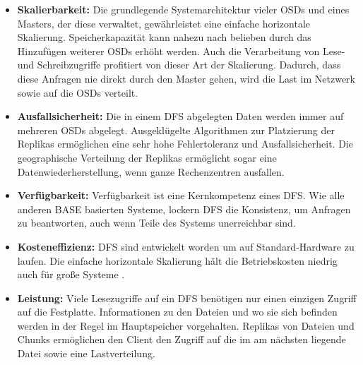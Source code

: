 \documentclass[12pt,oneside,a4paper,parskip]{scrbook}
\begin{document}
\begin{itemize}
  \item \textbf{Skalierbarkeit:} Die grundlegende Systemarchitektur vieler OSDs und eines Masters, der diese verwaltet, gewährleistet eine einfache horizontale Skalierung. Speicherkapazität kann nahezu nach belieben durch das Hinzufügen weiterer OSDs erhöht werden. Auch die Verarbeitung von Lese- und Schreibzugriffe profitiert von dieser Art der Skalierung. Dadurch, dass diese Anfragen nie direkt durch den Master gehen, wird die Last im Netzwerk sowie auf die OSDs verteilt.

  \item \textbf{Ausfallsicherheit:} Die in einem DFS abgelegten Daten werden immer auf mehreren OSDs abgelegt. Ausgeklügelte Algorithmen zur Platzierung der Replikas ermöglichen eine sehr hohe Fehlertoleranz und Ausfallsicherheit. Die geographische Verteilung der Replikas ermöglicht sogar eine Datenwiederherstellung, wenn ganze Rechenzentren ausfallen.

  \item \textbf{Verfügbarkeit:} Verfügbarkeit ist eine Kernkompetenz eines DFS. Wie alle anderen BASE basierten Systeme, lockern DFS die Konsistenz, um Anfragen zu beantworten, auch wenn Teile des Systems unerreichbar sind.

  \item \textbf{Kosteneffizienz:} DFS sind entwickelt worden um auf Standard-Hardware zu laufen. Die einfache horizontale Skalierung hält die Betriebskosten niedrig auch für große Systeme \cite{rdbmssuck}.

  \item \textbf{Leistung:} Viele Lesezugriffe auf ein DFS benötigen nur einen einzigen Zugriff auf die Festplatte. Informationen zu den Dateien und wo sie sich befinden werden in der Regel im Hauptspeicher vorgehalten. Replikas von Dateien und Chunks ermöglichen den Client den Zugriff auf die im am nächsten liegende Datei sowie eine Lastverteilung. 
\end{itemize}
\end{document}
